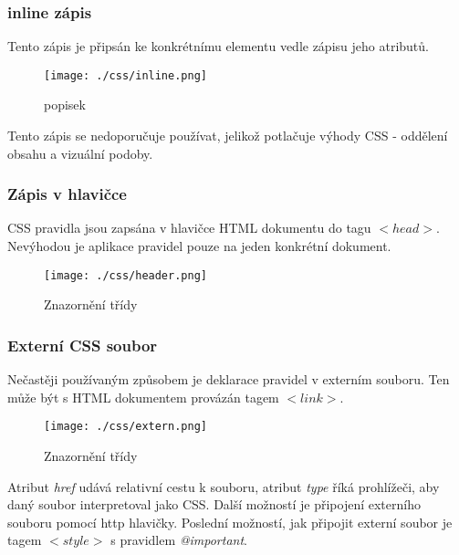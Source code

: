 \documentclass[main.tex]{subfiles}
\begin{document}
\subsubsection{inline zápis}
Tento zápis je připsán ke konkrétnímu elementu vedle zápisu jeho atributů.
		\begin{figure}[h]
			\centering
			\texttt{[image: ./css/inline.png]}
			\caption{popisek}
		\end{figure}
Tento zápis se nedoporučuje používat, jelikož potlačuje výhody CSS - oddělení obsahu a vizuální podoby.

\subsubsection{Zápis v hlavičce}
CSS pravidla jsou zapsána v hlavičce HTML dokumentu do tagu $<head>$. Nevýhodou je aplikace pravidel pouze na jeden konkrétní dokument.
		\begin{figure}[h]
			\centering
			\texttt{[image: ./css/header.png]}
			\caption{Znazornění třídy}
		\end{figure}
\subsubsection{Externí CSS soubor}
Nečastěji používaným způsobem je deklarace pravidel v externím souboru. Ten může být s HTML dokumentem provázán tagem \textit{$<link>$}.
		\begin{figure}[h]
			\centering
			\texttt{[image: ./css/extern.png]}
			\caption{Znazornění třídy}
		\end{figure}
Atribut \textit{href} udává relativní cestu k souboru, atribut \textit{type} říká prohlížeči, aby daný soubor interpretoval jako CSS. 
Další možností je připojení externího souboru pomocí http hlavičky.
Poslední možností, jak připojit externí soubor je tagem \textit{$<style>$} s pravidlem \textit{@important}.




\end{document}
